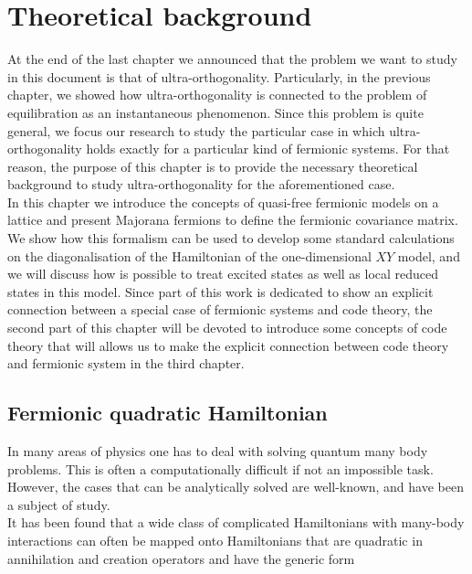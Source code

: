 \chapter{ Theoretical background }
At the end of the last chapter we announced that the problem we want to study in this document is that of ultra-orthogonality. Particularly, in the previous chapter, we showed how ultra-orthogonality is connected to the problem of equilibration as an instantaneous phenomenon. Since this problem is quite general, we focus our research to study the particular case in which ultra-orthogonality holds exactly for a particular kind of fermionic systems. For that reason, the purpose of this chapter is to provide the necessary theoretical background to study ultra-orthogonality for the aforementioned case.\\

\indent In this chapter we introduce the concepts of quasi-free fermionic models on a lattice and present Majorana fermions to define the fermionic covariance matrix. We show how this formalism can be used to develop some standard calculations on the diagonalisation of the Hamiltonian of the one-dimensional $XY$ model, and we will discuss how is possible to treat excited states as well as local reduced states in this model. Since part of this work is dedicated to show an explicit connection between a special case of fermionic systems and code theory, the second part of this chapter will be devoted to introduce some concepts of code theory that will allows us to make the explicit connection between code theory and fermionic system in the third chapter.

\section{Fermionic quadratic Hamiltonian}
In many areas of physics one has to deal with solving quantum many body problems. This is often a computationally difficult if not an impossible task. However, the cases that can be analytically solved are well-known, and have been a subject of study\cite{noauthor_density_2007,niu_majorana_2012,reyes-lega_aspects_2016,chung_density-matrix_2001,leijnse_introduction_2012, molinari_notes_2017,botero_bcs-like_2004, bravyi_lagrangian_2004, lieb_two_1961, latorre_ground_2004, katsura_statistical_1962, barouch_statistical_1971, barouch_statistical_1970}.\\
\indent It has been found that a wide class of complicated Hamiltonians with many-body interactions can often be mapped onto Hamiltonians that are quadratic in annihilation and creation operators and have the generic form \cite{botero_bcs-like_2004}

